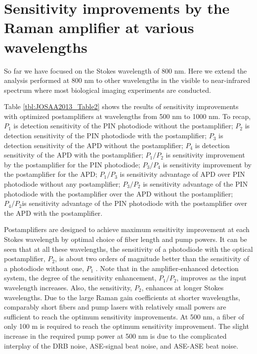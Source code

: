 \section{Sensitivity improvements by the Raman amplifier at various wavelengths}

So far we have focused on the Stokes wavelength of 800 nm. Here we extend the analysis performed at 800 nm to other wavelengths in the visible to near-infrared spectrum where most biological imaging experiments are conducted.

Table \ref{tbl:JOSAA2013_Table2} shows the results of sensitivity improvements with optimized postamplifiers at wavelengths from 500 nm to 1000 nm. To recap, $P_1$ is detection sensitivity of the PIN photodiode without the postamplifier; $P_2$ is detection sensitivity of the PIN photodiode with the postamplifier; $P_3$ is detection sensitivity of the APD without the postamplifier; $P_4$ is detection sensitivity of the APD with the postamplifier; $P_1/P_2$ is sensitivity improvement by the postamplifier for the PIN photodiode; $P_3/P_4$ is sensitivity improvement by the postamplifier for the APD; $P_1/P_3$ is sensitivity advantage of APD over PIN photodiode without any postamplifier; $P_3/P_2$ is sensitivity advantage of the PIN photodiode with the postamplifier over the APD without the postamplifier; $P_4/P_2$is sensitivity advantage of the PIN photodiode with the postamplifier over the APD with the postamplifier.

Postamplifiers are designed to achieve maximum sensitivity improvement at each Stokes wavelength by optimal choice of fiber length and pump powers. It can be seen that at all these wavelengths, the sensitivity of a photodiode with the optical postamplifier, $P_2$, is about two orders of magnitude better than the sensitivity of a photodiode without one, $P_1$ . Note that in the amplifier-enhanced detection system, the degree of the sensitivity enhancement, $P_1/P_2$, improves as the input wavelength increases. Also, the sensitivity, $P_2$, enhances at longer Stokes wavelengths. Due to the large Raman gain coefficients at shorter wavelengths, comparably short fibers and pump lasers with relatively small powers are sufficient to reach the optimum sensitivity improvements. At 500 nm, a fiber of only 100 m is required to reach the optimum sensitivity improvement. The slight increase in the required pump power at 500 nm is due to the complicated interplay of the DRB noise, ASE-signal beat noise, and ASE-ASE beat noise.

